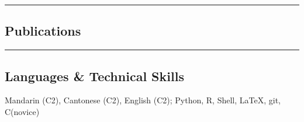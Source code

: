 \documentclass[10pt,a4paper]{article}
\newenvironment{indentsection}[1]%
{\begin{list}{}%
	{\setlength{\leftmargin}{#1}}%
	\item[]%
}
{\end{list}}
\newcommand{\CPP}
{C\nolinebreak[4]\hspace{-.05em}\raisebox{.22ex}{\footnotesize\bf ++}}
\begin{document}

\hrule
\vspace{-1em}
\subsection*{Publications}

\nocite{*} %

\printbibliography[heading=none]



\hrule
\vspace{-1em}
\subsection*{Languages \& Technical Skills}

\begin{indentsection}{\parindent}
	\begin{description*}
		\item {Mandarin (C2), Cantonese (C2), English (C2);
		      Python, R, Shell, \LaTeX, git, \CPP (novice)}

	\end{description*}



\end{indentsection}
\end{document}
